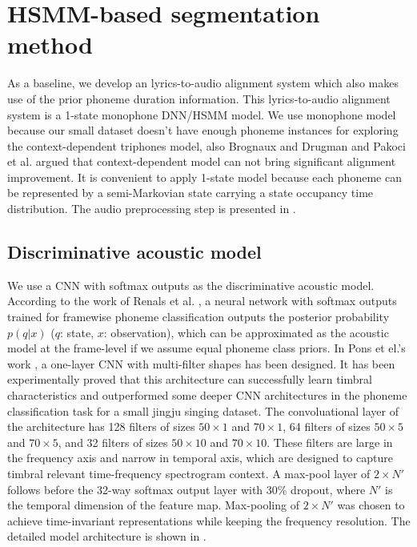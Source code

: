 \section{HSMM-based segmentation method}

As a baseline, we develop an lyrics-to-audio alignment system which also makes use of the prior phoneme duration information. This lyrics-to-audio alignment system is a 1-state monophone DNN/HSMM model. We use monophone model because our small dataset doesn't have enough phoneme instances for exploring the context-dependent triphones model, also Brognaux and Drugman \cite{brognaux2016hmm} and Pakoci et al. \cite{pakoci2016phonetic} argued that context-dependent model can not bring significant alignment improvement. It is convenient to apply 1-state model because each phoneme can be represented by a semi-Markovian state carrying a state occupancy time distribution. The audio preprocessing step is presented in .

\subsection{Discriminative acoustic model}

We use a CNN with softmax outputs as the discriminative acoustic model. According to the work of Renals et al. \cite{Renals1994Connectionist}, a neural network with softmax outputs trained for framewise phoneme classification outputs the posterior probability $p(q|x)$ ($q$: state, $x$: observation), which can be approximated as the acoustic model at the frame-level if we assume equal phoneme class priors. In Pons et el.'s work \cite{Pons2017Timbre}, a one-layer CNN with multi-filter shapes has been designed. It has been experimentally proved that this architecture can successfully learn timbral characteristics and outperformed some deeper CNN architectures in the phoneme classification task for a small jingju singing dataset. The convoluational layer of the architecture has 128 filters of sizes $50{\times}1$ and $70{\times}1$, 64 filters of sizes $50{\times}5$ and $70{\times}5$, and 32 filters of sizes $50{\times}10$ and $70{\times}10$. These filters are large in the frequency axis and narrow in temporal axis, which are designed to capture timbral relevant time-frequency spectrogram context. A max-pool layer of $2{\times}N'$ follows before the 32-way softmax output layer with 30\% dropout, where $N'$ is the temporal dimension of the feature map. Max-pooling of $2{\times}N'$ was chosen to achieve time-invariant representations
while keeping the frequency resolution. The detailed model architecture is shown in .

